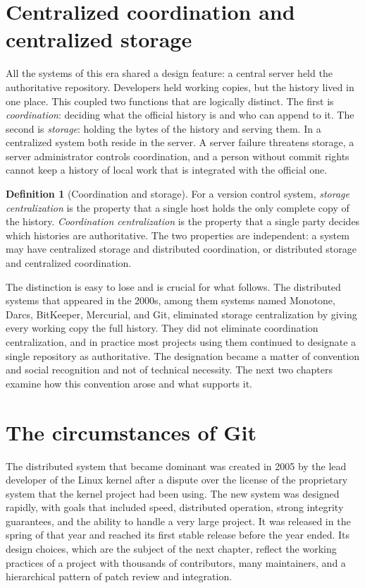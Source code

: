 \documentclass[11pt,twoside,openright]{book}
\theoremstyle{plain}
\theoremstyle{definition}
\newtheorem{definition}[theorem]{Definition}
\theoremstyle{remark}
\begin{document}
\section{Centralized coordination and centralized storage}

All the systems of this era shared a design feature: a central server held the authoritative repository. Developers held working copies, but the history lived in one place. This coupled two functions that are logically distinct. The first is \emph{coordination}: deciding what the official history is and who can append to it. The second is \emph{storage}: holding the bytes of the history and serving them. In a centralized system both reside in the server. A server failure threatens storage, a server administrator controls coordination, and a person without commit rights cannot keep a history of local work that is integrated with the official one.

\begin{definition}[Coordination and storage]\label{def:coordstorage}
For a version control system, \emph{storage centralization} is the property that a single host holds the only complete copy of the history. \emph{Coordination centralization} is the property that a single party decides which histories are authoritative. The two properties are independent: a system may have centralized storage and distributed coordination, or distributed storage and centralized coordination.
\end{definition}

The distinction is easy to lose and is crucial for what follows. The distributed systems that appeared in the 2000s, among them systems named Monotone, Darcs, BitKeeper, Mercurial, and Git, eliminated storage centralization by giving every working copy the full history. They did not eliminate coordination centralization, and in practice most projects using them continued to designate a single repository as authoritative. The designation became a matter of convention and social recognition and not of technical necessity. The next two chapters examine how this convention arose and what supports it.

\section{The circumstances of Git}

The distributed system that became dominant was created in 2005 by the lead developer of the Linux kernel after a dispute over the license of the proprietary system that the kernel project had been using. The new system was designed rapidly, with goals that included speed, distributed operation, strong integrity guarantees, and the ability to handle a very large project. It was released in the spring of that year and reached its first stable release before the year ended. Its design choices, which are the subject of the next chapter, reflect the working practices of a project with thousands of contributors, many maintainers, and a hierarchical pattern of patch review and integration.
\end{document}
